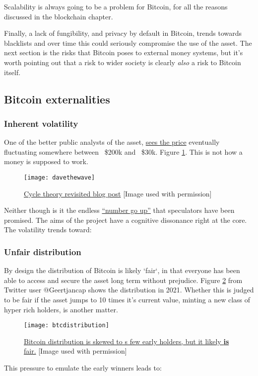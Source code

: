 Scalability is always going to be a problem for Bitcoin, for all the reasons discussed in the blockchain chapter.\par 
Finally, a lack of fungibility, and privacy by default in Bitcoin, trends towards blacklists and over time this could seriously compromise the use of the asset. The next section is the risks that Bitcoin poses to external money systems, but it's worth pointing out that a risk to wider society is clearly \textit{also} a risk to Bitcoin itself.
\subsection{Bitcoin externalities}
\subsubsection{Inherent volatility}
One of the better public analysts of the asset, \href{https://twitter.com/davthewave/status/1072441941390974982/photo/1}{sees the price} eventually fluctuating somewhere between ~\$200k and ~\$30k.  Figure \ref{fig:davethewave}. This is not how a money is supposed to work. 

\begin{figure}
  \centering
    \texttt{[image: davethewave]}
  \caption{\href{https://davethewave.substack.com/p/cycle-theory-revisited?s=r}{Cycle theory revisited blog post} [Image used with permission]}
  \label{fig:davethewave}
\end{figure}

Neither though is it the endless \href{https://stephanlivera.com/episode/147/}{``number go up''} that speculators have been promised. The aims of the project have a cognitive dissonance right at the core. The volatility trends toward:
\subsubsection{Unfair distribution}
By design the distribution of Bitcoin is likely `fair`, in that everyone has been able to access and secure the asset long term without prejudice. Figure \ref{fig:btcdistribution} from Twitter user @Geertjancap shows the distribution in 2021. Whether this is judged to be fair if the asset jumps to 10 times it's current value, minting a new class of hyper rich holders, is another matter. 
\begin{figure}
  \centering
    \texttt{[image: btcdistribution]}
  \caption{\href{https://twitter.com/Geertjancap/status/1380972132990136322/photo/1}{Bitcoin distribution is skewed to s few early holders, but it likely \textbf{is} fair.} [Image used with permission]}
  \label{fig:btcdistribution}
\end{figure}
This pressure to emulate the early winners leads to:
